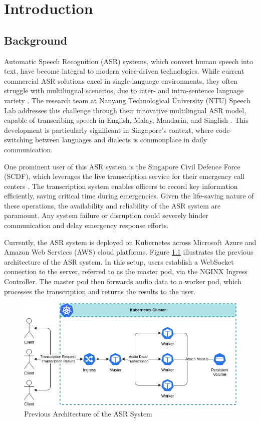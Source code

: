\chapter{Introduction} \label{chapter:introduction}
\section{Background}

Automatic Speech Recognition (ASR) systems, which convert human speech into text, have become integral to modern voice-driven technologies. While current commercial ASR solutions excel in single-language environments, they often struggle with multilingual scenarios, due to inter- and intra-sentence language variety \cite{code_switching}. The research team at Nanyang Technological University (NTU) Speech Lab addresses this challenge through their innovative multilingual ASR model, capable of transcribing speech in English, Malay, Mandarin, and Singlish \cite{speech_lab,scdf_2}. This development is particularly significant in Singapore's context, where code-switching between languages and dialects is commonplace in daily communication.

One prominent user of this ASR system is the Singapore Civil Defence Force (SCDF), which leverages the live transcription service for their emergency call centers \cite{scdf}. The transcription system enables officers to record key information efficiently, saving critical time during emergencies. Given the life-saving nature of these operations, the availability and reliability of the ASR system are paramount. Any system failure or disruption could severely hinder communication and delay emergency response efforts.

Currently, the ASR system is deployed on Kubernetes across Microsoft Azure and Amazon Web Services (AWS) cloud platforms. Figure \ref{fig:previous_architecture} illustrates the previous architecture of the ASR system. In this setup, users establish a WebSocket connection to the server, referred to as the master pod, via the NGINX Ingress Controller. The master pod then forwards audio data to a worker pod, which processes the transcription and returns the results to the user.

\begin{figure}[!ht]
    \centering
    \includegraphics[width=\textwidth]{figures/previous_architecture.drawio.png}
    \caption{Previous Architecture of the ASR System}
    \label{fig:previous_architecture}
\end{figure}

